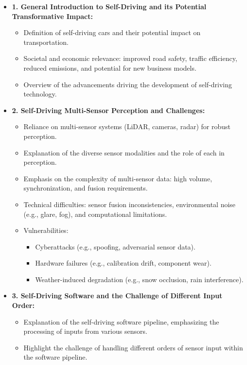 \begin{itemize}
    \item \textbf{1. General Introduction to Self-Driving and its Potential Transformative Impact:}
    \begin{itemize}
        \item Definition of self-driving cars and their potential impact on transportation.
        \item Societal and economic relevance: improved road safety, traffic efficiency, reduced emissions, and potential for new business models.
        \item Overview of the advancements driving the development of self-driving technology.
    \end{itemize}
    \item \textbf{2. Self-Driving Multi-Sensor Perception and Challenges:}
    \begin{itemize}
        \item Reliance on multi-sensor systems (LiDAR, cameras, radar) for robust perception.
        \item Explanation of the diverse sensor modalities and the role of each in perception.
        \item Emphasis on the complexity of multi-sensor data: high volume, synchronization, and fusion requirements.
        \item Technical difficulties: sensor fusion inconsistencies, environmental noise (e.g., glare, fog), and computational limitations.
        \item Vulnerabilities:
        \begin{itemize}
            \item Cyberattacks (e.g., spoofing, adversarial sensor data).
            \item Hardware failures (e.g., calibration drift, component wear).
            \item Weather-induced degradation (e.g., snow occlusion, rain interference).
        \end{itemize}
    \end{itemize}
    \item \textbf{3. Self-Driving Software and the Challenge of Different Input Order:}
    \begin{itemize}
        \item Explanation of the self-driving software pipeline, emphasizing the processing of inputs from various sensors.
        \item Highlight the challenge of handling different orders of sensor input within the software pipeline.

\end{itemize}
\end{itemize}
